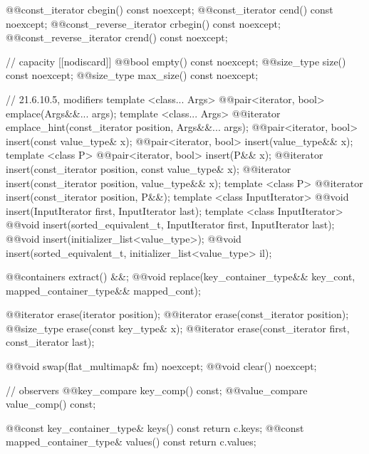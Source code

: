 \begin{codeblock}
{{    @@const_iterator          cbegin() const noexcept;
    @@const_iterator          cend() const noexcept;
    @@const_reverse_iterator  crbegin() const noexcept;
    @@const_reverse_iterator  crend() const noexcept;

    // capacity
    [[nodiscard]] @@bool empty() const noexcept;
    @@size_type size() const noexcept;
    @@size_type max_size() const noexcept;

    // 21.6.10.5, modifiers
    template <class... Args> @@pair<iterator, bool> emplace(Args&&... args);
    template <class... Args>
      @@iterator emplace_hint(const_iterator position, Args&&... args);
    @@pair<iterator, bool> insert(const value_type& x);
    @@pair<iterator, bool> insert(value_type&& x);
    template <class P> @@pair<iterator, bool> insert(P&& x);
    @@iterator insert(const_iterator position, const value_type& x);
    @@iterator insert(const_iterator position, value_type&& x);
    template <class P>
      @@iterator insert(const_iterator position, P&&);
    template <class InputIterator>
      @@void insert(InputIterator first, InputIterator last);
    template <class InputIterator>
      @@void insert(sorted_equivalent_t, InputIterator first, InputIterator last);
    @@void insert(initializer_list<value_type>);
    @@void insert(sorted_equivalent_t, initializer_list<value_type> il);

    @@containers extract() &&;
    @@void replace(key_container_type&& key_cont, mapped_container_type&& mapped_cont);

    @@iterator erase(iterator position);
    @@iterator erase(const_iterator position);
    @@size_type erase(const key_type& x);
    @@iterator erase(const_iterator first, const_iterator last);

    @@void swap(flat_multimap& fm) noexcept;
    @@void clear() noexcept;

    // observers
    @@key_compare key_comp() const;
    @@value_compare value_comp() const;

    @@const key_container_type& keys() const      { return c.keys; }
    @@const mapped_container_type& values() const { return c.values; }

}}
\end{codeblock}
